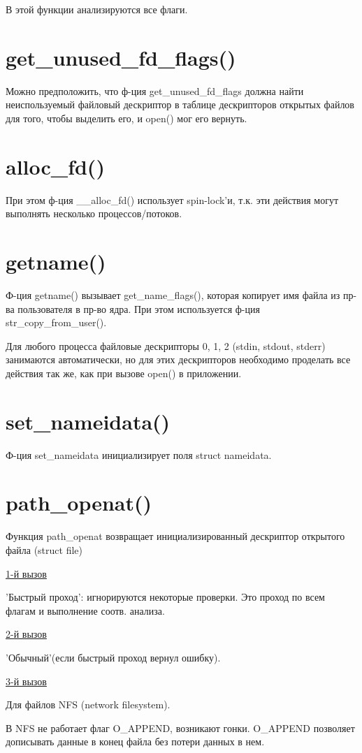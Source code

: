 В этой функции анализируются все флаги.

\section{get\_unused\_fd\_flags()}
Можно предположить, что ф-ция get\_unused\_fd\_flags должна найти неиспользуемый файловый дескриптор в таблице дескрипторов открытых файлов для того, чтобы выделить его, и open() мог его вернуть.

\section{alloc\_fd()}
При этом ф-ция \_\_alloc\_fd() использует spin-lock'и, т.к. эти действия могут выполнять несколько процессов/потоков.

\section{getname()}
Ф-ция getname() вызывает get\_name\_flags(), которая копирует имя файла из пр-ва пользователя в пр-во ядра. При этом используется ф-ция str\_copy\_from\_user().

Для любого процесса файловые дескрипторы 0, 1, 2 (stdin, stdout, stderr) занимаются автоматически, но для этих дескрипторов необходимо проделать все действия так же, как при вызове open() в приложении.


\section{set\_nameidata()}
Ф-ция set\_nameidata инициализирует поля struct nameidata.

\section{path\_openat()}
Функция path\_openat возвращает инициализированный дескриптор открытого файла (struct file)

\underline{1-й вызов}

'Быстрый проход': игнорируются некоторые проверки. Это проход по всем флагам и выполнение соотв. анализа.

\underline{2-й вызов}

'Обычный'(если быстрый проход вернул ошибку).

\underline{3-й вызов}

Для файлов NFS (network filesystem).

В NFS не работает флаг O\_APPEND, возникают гонки. O\_APPEND позволяет дописывать данные в конец файла без потери данных в нем.


